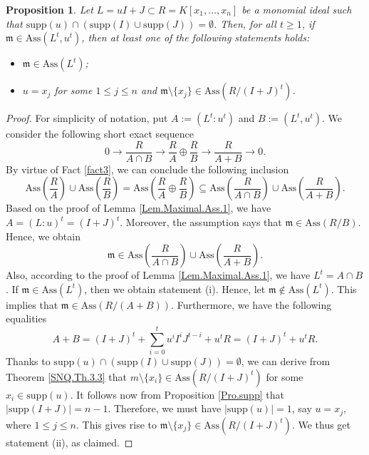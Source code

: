 \documentclass[11pt]{amsart}
\newtheorem{proposition}[theorem]{Proposition}
\begin{document}



\begin{proposition}\label{Pro.Maximal.Ass.2}
Let $L=uI+J \subset R=K[x_1, \ldots, x_n]$ be a monomial ideal such that  $\mathrm{supp}(u) \cap (\mathrm{supp}(I) \cup \mathrm{supp}(J))=\emptyset$. Then, for all $t\geq 1$,  if $\mathfrak{m}\in \mathrm{Ass}(L^t,u^t)$,  then at least one of the following statements holds:
\begin{itemize}
\item[(i)] $\mathfrak{m}\in \mathrm{Ass}(L^t)$;
\item[(ii)] $u=x_j$ for some $1\leq j \leq n$ and $\mathfrak{m}\setminus \{x_j\}\in \mathrm{Ass}(R/(I+J)^t)$. 
\end{itemize}
\end{proposition}

\begin{proof}
For simplicity of notation, put $A:=(L^t: u^t)$ and $B:=(L^t,u^t)$. We consider the following short exact sequence
$$0\longrightarrow \frac{R}{A\cap B} {\longrightarrow} \frac{R}{A} \oplus \frac{R}{B} {\longrightarrow} \frac{R}{A+B}  \longrightarrow 0.$$
 By virtue of Fact \ref{fact3}, we can conclude  the following inclusion
 $$\mathrm{Ass}(\frac{R}{A})\cup \mathrm{Ass}(\frac{R}{B})=\mathrm{Ass}(\frac{R}{A} \oplus \frac{R}{B}) \subseteq \mathrm{Ass}(\frac{R}{A\cap B}) \cup \mathrm{Ass}(\frac{R}{A+B}).$$ 
 Based on the proof of Lemma \ref{Lem.Maximal.Ass.1}, we have $A=(L:u)^t=(I+J)^t$. Moreover, the assumption says that $\mathfrak{m}\in \mathrm{Ass}(R/B)$. 
 Hence, we obtain  $$\mathfrak{m}\in \mathrm{Ass}(\frac{R}{A\cap B}) \cup \mathrm{Ass}(\frac{R}{A+B}).$$ 
 Also, according to the proof of Lemma \ref{Lem.Maximal.Ass.1}, we have $L^t=A\cap B$. If $\mathfrak{m}\in \mathrm{Ass}(L^t)$, then we obtain  statement (i). 
 Hence,  let  $\mathfrak{m}\notin \mathrm{Ass}(L^t)$. This implies that $\mathfrak{m}\in \mathrm{Ass}(R/(A+B))$. Furthermore, we have the following equalities $$A+B=(I+J)^t+\sum_{i=0}^tu^iI^iJ^{t-i} + u^tR=(I+J)^t+ u^tR.$$ 
 Thanks to  $\mathrm{supp}(u) \cap (\mathrm{supp}(I) \cup \mathrm{supp}(J))=\emptyset$, we can derive from   Theorem \ref{SNQ.Th.3.3} that 
 $m\setminus \{x_i\} \in \mathrm{Ass}(R/(I+J)^t)$ for some $x_i\in \mathrm{supp}(u)$. It follows now from Proposition \ref{Pro.supp} 
 that $|\mathrm{supp}(I+J)|=n-1$. 
 Therefore, we must have  $|\mathrm{supp}(u)|=1$, say  $u=x_j$, where $1\leq j \leq n$. This gives rise to  $\mathfrak{m}\setminus \{x_j\}\in \mathrm{Ass}(R/(I+J)^t)$. 
 We thus get  statement (ii), as claimed.
 \end{proof}
\end{document}
